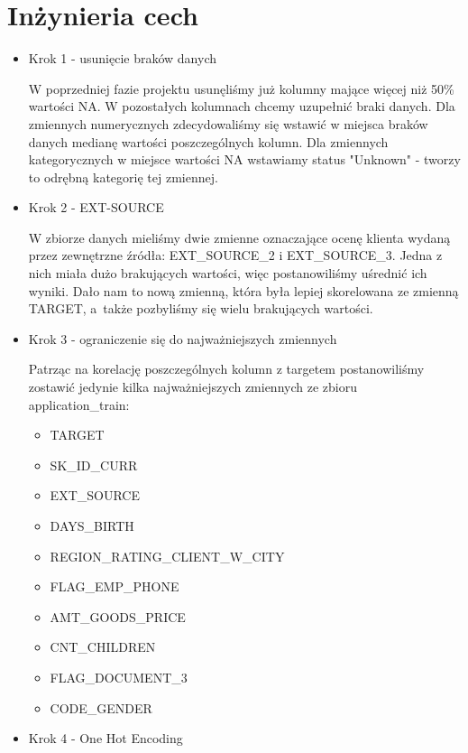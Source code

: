 \documentclass[12pt]{article}
\begin{document}
\newpage
 
\section{Inżynieria cech}

\begin {itemize}
\item {Krok 1 - usunięcie braków danych}

W poprzedniej fazie projektu usunęliśmy już kolumny mające więcej niż 50\% wartości NA. W pozostałych kolumnach chcemy uzupełnić braki danych.
Dla zmiennych numerycznych zdecydowaliśmy się wstawić w miejsca braków danych medianę wartości poszczególnych kolumn.
Dla zmiennych kategorycznych w miejsce wartości NA wstawiamy status "Unknown" - tworzy to odrębną kategorię tej zmiennej.

\item {Krok 2 - EXT-SOURCE}

W zbiorze danych mieliśmy dwie zmienne oznaczające ocenę klienta wydaną przez zewnętrzne źródła: EXT\_SOURCE\_2 i EXT\_SOURCE\_3. Jedna z nich miała dużo brakujących wartości, więc postanowiliśmy uśrednić ich wyniki. Dało nam to nową zmienną, która była lepiej skorelowana ze zmienną TARGET, a~także pozbyliśmy się wielu brakujących wartości.

\item {Krok 3 - ograniczenie się do najważniejszych zmiennych}

Patrząc na korelację poszczególnych kolumn z targetem postanowiliśmy zostawić jedynie kilka najważniejszych zmiennych ze zbioru application\_train:

\begin{itemize}
\item{TARGET} 
\item{SK\_ID\_CURR} 
\item{EXT\_SOURCE} 
\item{DAYS\_BIRTH} 
\item{REGION\_RATING\_CLIENT\_W\_CITY} 
\item{FLAG\_EMP\_PHONE} 
\item{AMT\_GOODS\_PRICE} 
\item{CNT\_CHILDREN} 
\item{FLAG\_DOCUMENT\_3}
\item{CODE\_GENDER}
\end{itemize}

\item {Krok 4 - One Hot Encoding}


\end{itemize}
\end{document}
